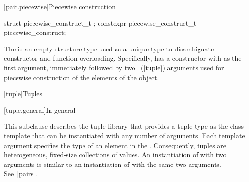 [pair.piecewise]{Piecewise construction}

%
%
\begin{itemdecl}
struct piecewise_construct_t { };
constexpr piecewise_construct_t piecewise_construct{};
\end{itemdecl}

\pnum
The   is an empty structure type
used as a unique type to disambiguate constructor and function overloading. Specifically,
 has a constructor with  as the
first argument, immediately followed by two ~(\ref{tuple}) arguments used
for piecewise construction of the elements of the  object.

[tuple]{Tuples}

[tuple.general]{In general}

\pnum
{}%
This subclause describes the tuple library that provides a tuple type as
the class template  that can be instantiated with any number
of arguments. Each template argument specifies
the type of an element in the .  Consequently, tuples are
heterogeneous, fixed-size collections of values. An instantiation of  with
two arguments is similar to an instantiation of  with the same two arguments.
See~\ref{pairs}.

\pnum
{}

